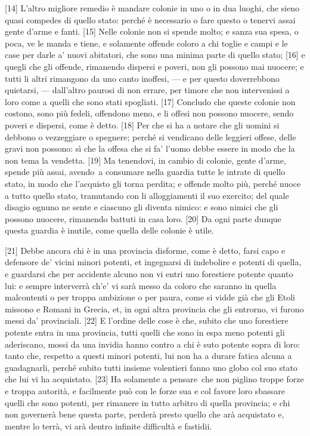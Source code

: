{[}14{]} L'altro migliore remedio è mandare colonie in uno o in dua
luoghi, che sieno quasi compedes di quello stato: perché è necessario o
fare questo o tenervi assai gente d'arme e fanti. {[}15{]} Nelle colonie
non si spende molto; e sanza sua spesa, o poca, ve le manda e tiene, e
solamente offende coloro a chi toglie e campi e le case per darle a'
nuovi abitatori, che sono una minima parte di quello stato; {[}16{]} e
quegli che gli offende, rimanendo dispersi e poveri, non gli possono mai
nuocere; e tutti li altri rimangono da uno canto inoffesi, --- e per
questo doverrebbono quietarsi, --- dall'altro paurosi di non errare, per
timore che non intervenissi a loro come a quelli che sono stati
spogliati. {[}17{]} Concludo che queste colonie non costono, sono più
fedeli, offendono meno, e li offesi non possono nuocere, sendo poveri e
dispersi, come è detto. {[}18{]} Per che si ha a notare che gli uomini
si debbono o vezzeggiare o spegnere; perché si vendicano delle leggieri
offese, delle gravi non possono: sì che la offesa che si fa' l'uomo
debbe essere in modo che la non tema la vendetta. {[}19{]} Ma tenendovi,
in cambio di colonie, gente d'arme, spende più assai, avendo\est\ a consumare
nella guardia tutte le intrate di quello stato, in modo che l'acquisto
gli torna perdita; e offende molto più, perché nuoce a tutto quello
stato, tramutando con li alloggiamenti il suo exercito; del quale
disagio ognuno ne sente e ciascuno gli diventa nimico: e sono nimici che
gli possono nuocere, rimanendo battuti in casa loro. {[}20{]} Da ogni
parte dunque questa guardia è inutile, come quella delle colonie è
utile.

{[}21{]} Debbe ancora chi è in una provincia disforme, come è detto,
farsi capo e defensore de' vicini minori potenti, et ingegnarsi di
indebolire e potenti di quella, e guardarsi che per accidente alcuno non
vi entri uno forestiere potente quanto lui: e sempre interverrà ch'e' vi
sarà messo da coloro che saranno in quella malcontenti o per troppa
ambizione o per paura, come si vidde già che gli Etoli missono e Romani
in Grecia, et, in ogni altra provincia che gli entrorno, vi furono messi
da' provinciali. {[}22{]} E l'ordine delle cose è che, subito che uno
forestiere potente entra in una provincia, tutti quelli che sono in espa
meno potenti gli aderiscano, mossi da una invidia hanno contro a chi è
suto potente sopra di loro: tanto che, respetto a questi minori potenti,
lui non ha a durare fatica alcuna a guadagnarli, perché subito tutti
insieme volentieri fanno uno globo col suo stato che lui vi ha
acquistato. {[}23{]} Ha solamente a pensare\est\ che non piglino troppe forze
e troppa autorità, e facilmente può con le forze sua e col favore loro
sbassare quelli che sono potenti, per rimanere in tutto arbitro di
quella provincia; e chi non governerà bene questa parte, perderà presto
quello che arà acquistato e, mentre lo terrà, vi arà dentro infinite
difficultà e fastidii.

